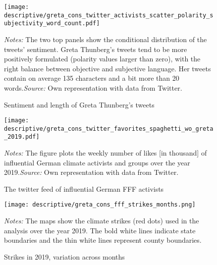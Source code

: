 \restoregeometry
\vspace*{\fill}
\begin{figure}[H]
	\centering\caption{Sentiment and length of Greta Thunberg's tweets}
	\label{fig_greta_cons:twitter_greta_sentiment_length}
	\texttt{[image: descriptive/greta\_cons\_twitter\_activists\_scatter\_polarity\_subjectivity\_word\_count.pdf]}
	\begin{minipage}{0.99\linewidth}
		\scriptsize{\emph{Notes:} The two top panels show the conditional distribution of the tweets' sentiment. Greta Thunberg's tweets tend to be more positively formulated (polarity values larger than zero), with the right balance between objective and subjective language. Her tweets contain on average 135 characters and a bit more than 20 words.\newline\emph{Source:} Own representation with data from Twitter.}
	\end{minipage}
\end{figure}
\vspace*{\fill}\clearpage
\vspace*{\fill}
\begin{figure}[H]
	\centering\caption{The twitter feed of influential German FFF activists}\label{fig_greta_cons:twitter_favorites_activists}
	\texttt{[image: descriptive/greta\_cons\_twitter\_favorites\_spaghetti\_wo\_greta\_2019.pdf]}
	\begin{minipage}{0.99\linewidth}
		\scriptsize{\emph{Notes:} The figure plots the weekly number of likes [in thousand] of influential German climate activists and groups over the year 2019.\newline\emph{Source:} Own representation with data from Twitter.}
	\end{minipage}
\end{figure}
\vspace*{\fill}\clearpage
\vspace*{\fill}
\begin{figure}[H]\centering
	\caption{Strikes in 2019, variation across months}\label{fig_greta_cons:fff_strikes_months}
	\texttt{[image: descriptive/greta\_cons\_fff\_strikes\_months.png]}
	\begin{minipage}{0.99\linewidth}
		\scriptsize{\emph{Notes:} The maps show the climate strikes (red dots) used in the analysis over the year 2019. The bold white lines indicate state boundaries and the thin white lines represent county boundaries.}
	\end{minipage}
\end{figure}
